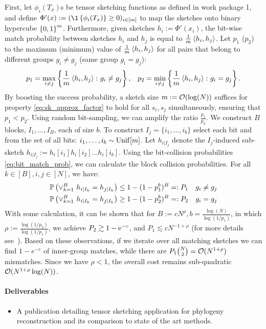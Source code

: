 First, let $\phi_i(T_x)$s be tensor sketching functions as defined in work package 1, and define $\Phi'(x):=(\1 \set{\phi_i(T_x)}\ge 0)_{i\in [m]}$ to map the sketches onto binary hypercube $ \left\{0,1\right\}^m$. Furthermore, given sketches $h_i:=\Phi'(x_i)$, the bit-wise match probability between sketches $h_i$ and $h_j$ is equal to $\frac{1}{m}\left\langle h_i, h_j \right\rangle$. Let $p_1$ ($p_2$) to the maximum (minimum) value of $\frac{1}{m}\left\langle h_i, h_j \right\rangle$ for all pairs that belong to different groups $g_i\neq g_j$ (same group $g_i = g_j$):
\begin{align}
\label{eq:bit_match_prob}
p_1=\max_{i\neq j} \left\{\frac{1}{m}\left\langle h_i, h_j \right\rangle\colon g_i \neq g_j\right\},&&
p_2=\min_{i\neq j} \left\{\frac{1}{m}\left\langle h_i, h_j \right\rangle \colon g_i = g_j \right\}.
\end{align}
By boosting the success probability, a sketch size $m:=\mathcal{O}(\log(N))$ suffices for property \eqref{eq:sk_approx_factor} to hold for all $s_i,s_j$ simultaneously, ensuring that $p_1 < p_2$. 
Using random bit-sampling, we can amplify the ratio $\frac{p_1}{p_2}$. We construct $B$ blocks, $I_1,\dots,I_B$, each of size $b$. To construct $I_j=\{i_1,\dots, i_b\}$ select each bit \iid and \uar from the set of all bits: $i_1,\dots,i_b\sim\operatorname{\mathrm{Unif}}[m]$. Let $h_{i|I_j}$ denote the $I_j$-induced sub-sketch $h_{i|I_j}:=h_i[i_1] h_i[i_2] \dots h_i[i_b]$. Using the bit-collision probabilities \eqref{eq:bit_match_prob}, we can calculate the block collision probabilities. 
For all $k\in[B],i,j\in[N]$, we have:
\begin{align}
&\mathbb{P}\left( \vee_{k=1}^B\ h_{i|I_k}= h_{j|I_k} \right)\le 1-(1-p_1^b)^B=:P_1 && g_i \neq g_j \\
&\mathbb{P}\left( \vee_{k=1}^B\ h_{i|I_k}= h_{j|I_k} \right)\ge 1-(1-p_2^b)^B=:P_2 && g_i = g_j 
\end{align}
With some calculation, it can be shown that for $B:=c N^\rho, b=\frac{\log(N)}{\log(1/p_1)}$, in which $\rho:=\frac{\log(1/p_2)}{\log(1/p_1)}$, we achieve $P_2\gtrsim 1-\text{e}^{-c}$, and $P_1\lesssim c N^{-1+\rho}$ (for more details see~\cite{datar2004locality}). Based on these observations, if we iterate over all matching sketches we can find $1-e^{-c}$ of inner-group matches, while there are  $P_1\binom{N}{2} = \mathcal{O}(N^{1+\rho})$ mismatches. Since we have $\rho<1$, the overall cost remains sub-quadratic $\mathcal{O}(N^{1+\rho}\log(N))$. 





\paragraph{Deliverables}
\begin{itemize}
\item A publication detailing tensor sketching application for phylogeny reconstruction and its comparison to state of the art methods. 
\end{itemize}


